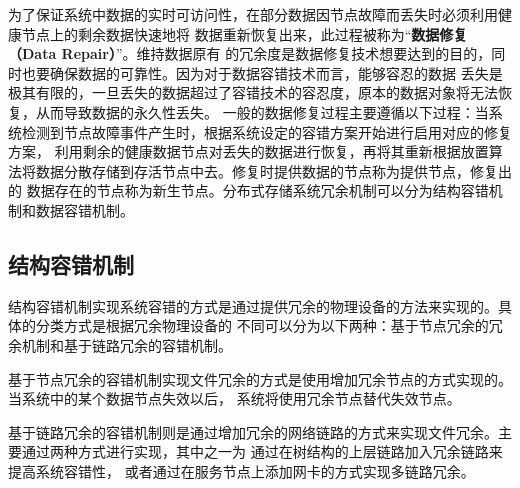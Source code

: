 为了保证系统中数据的实时可访问性，在部分数据因节点故障而丢失时必须利用健康节点上的剩余数据快速地将
数据重新恢复出来，此过程被称为“\textbf{数据修复（Data Repair）}”\cite{li2009tree}。维持数据原有
的冗余度是数据修复技术想要达到的目的，同时也要确保数据的可靠性。因为对于数据容错技术而言，能够容忍的数据
丢失是极其有限的，一旦丢失的数据超过了容错技术的容忍度，原本的数据对象将无法恢复，从而导致数据的永久性丢失。
一般的数据修复过程主要遵循以下过程：当系统检测到节点故障事件产生时，根据系统设定的容错方案开始进行启用对应的修复方案，
利用剩余的健康数据节点对丢失的数据进行恢复，再将其重新根据放置算法将数据分散存储到存活节点中去。修复时提供数据的节点称为提供节点，修复出的
数据存在的节点称为新生节点。分布式存储系统冗余机制可以分为结构容错机制和数据容错机制。

\subsection{结构容错机制}
结构容错机制实现系统容错的方式是通过提供冗余的物理设备的方法来实现的。具体的分类方式是根据冗余物理设备的
不同可以分为以下两种：基于节点冗余的冗余机制和基于链路冗余的容错机制。

基于节点冗余的容错机制实现文件冗余的方式是使用增加冗余节点的方式实现的。当系统中的某个数据节点失效以后，
系统将使用冗余节点替代失效节点\cite{ghemawat2003google,hua2009smartstore,weil2004dynamic}。

基于链路冗余的容错机制则是通过增加冗余的网络链路的方式来实现文件冗余。主要通过两种方式进行实现，其中之一为
通过在树结构的上层链路加入冗余链路来提高系统容错性\cite{al2008scalable,greenberg2011vl2}，
或者通过在服务节点上添加网卡的方式实现多链路冗余\cite{guo2008dcell,guo2009bcube}。

